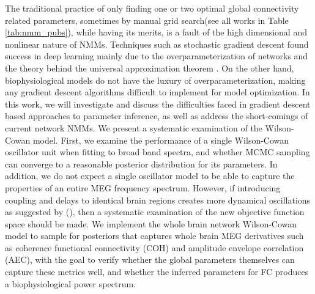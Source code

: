 
The traditional practice of only finding one or two optimal global connectivity related parameters, sometimes by manual grid search(see all works in Table \ref{tab:nmm_pubs}), while having its merits, is a fault of the high dimensional and nonlinear nature of NMMs. Techniques such as stochastic gradient descent found success in deep learning mainly due to the overparameterization of networks and the theory behind the universal approximation theorem \cite{lu_expressive_2017, zhou_universality_2020}. On the other hand, biophysiological models do not have the luxury of overparameterization, making any gradient descent algorithms difficult to implement for model optimization. In this work, we will investigate and discuss the difficulties faced in gradient descent based approaches to parameter inference, as well as address the short-comings of current network NMMs. We present a systematic examination of the Wilson-Cowan model. First, we examine the performance of a single Wilson-Cowan oscillator unit when fitting to broad band spectra, and whether MCMC sampling can converge to a reasonable posterior distribution for its parameters. In addition, we do not expect a single oscillator model to be able to capture the properties of an entire MEG frequency spectrum. However, if introducing coupling and delays to identical brain regions creates more dynamical oscillations as suggested by (\cite{Deco2009}), then a systematic examination of the new objective function space should be made. We implement the whole brain network Wilson-Cowan model to sample for posteriors that captures whole brain MEG derivatives such as coherence functional connectivity (COH) and amplitude envelope correlation (AEC), with the goal to verify whether the global parameters themselves can capture these metrics well, and whether the inferred parameters for FC produces a biophysiological power spectrum.

